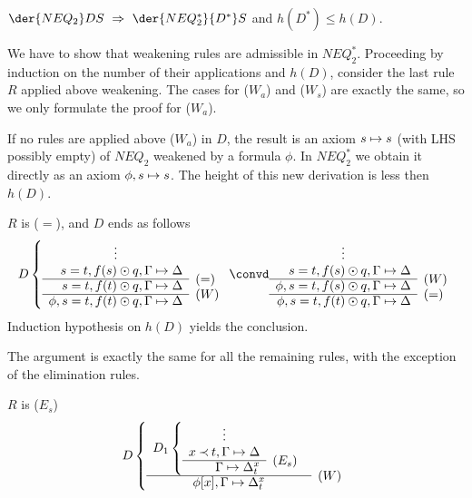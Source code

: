 \begin{LEMMA}\label{le:noweak}
 $\der{NEQ_2}DS\ \impl\ \der{NEQ_2^*}{D^*}S$ and $h(D^*)\leq h(D)$.
\end{LEMMA}
\begin{PROOF}
We have to show that weakening rules are admissible in $NEQ_2^*$. Proceeding
by induction on the number of their applications and $h(D)$, consider the
last rule $R$ applied above weakening. The cases for ($W_a$) and ($W_s$) are
exactly the same, so we only formulate the proof for ($W_a$).
\begin{LS}
\item If no rules are applied above ($W_a$) in $D$, the result is an axiom
 $s\mathrel{\mapsto} s$ (with LHS possibly empty) of
 $NEQ_2$ weakened by a formula $\phi$. In $NEQ_2^*$ we obtain it directly as
 an axiom $\phi,s \mathrel{\mapsto} s$. The height of this new derivation is less then $h(D)$.
\item $R$ is ($=$), and $D$ ends as follows
\[ D \left \{ \begin{array}{rl}
 \multicolumn{1}{c}{\vdots} \\
 s=t, f(s)\odot q, \GSD \\ \cline{1-1}
 s=t, f(t)\odot q, \GSD & \rabove{(=)} \\ \cline{1-1}
 \phi, s=t, f(t)\odot q, \GSD & \rabove{(W)} \end{array} \right . \convd
 \begin{array}{rl}
 \multicolumn{1}{c}{\vdots} \\
 s=t, f(s)\odot q, \GSD \\ \cline{1-1}
 \phi, s=t, f(s)\odot q, \GSD & \rabove{(W)} \\ \cline{1-1}
 \phi, s=t, f(t)\odot q, \GSD & \rabove{(=)} \end{array} \]
Induction hypothesis on $h(D)$ yields the conclusion.
\item The argument is exactly the same for all the remaining rules, with the
exception of the elimination rules.
\item $R$ is ($E_s$)
\[ D \left \{ \begin{array}{cl}
 D_1 \left \{ \begin{array}{rl}
 \multicolumn{1}{c}{\vdots} \\
 x\Incl t,  \GSD \\ \cline{1-1}
  \GSD_t^x & \rabove{(E_s)} \end{array} \right . \\ \cline{1-1}
 \phi[x], \GSD_t^x & \rabove{(W)} \end{array} \right . \]

\end{LS}
\end{PROOF}
